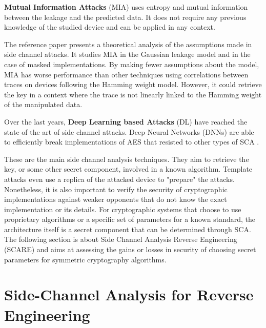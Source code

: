 \documentclass[11pt]{sdm}
\begin{document}
\textbf{Mutual Information Attacks} (MIA) uses entropy and mutual information between the leakage and the predicted data.
It does not require any previous knowledge of the studied device and can be applied in any context.

The reference paper \parencite{Prouff_Rivain_2009} presents a theoretical analysis of the assumptions made in side channel attacks.
It studies MIA in the Gaussian leakage model and in the case of masked implementations.
By making fewer assumptions about the model, MIA has worse performance than other techniques using correlations between traces on devices following the Hamming weight model.
However, it could retrieve the key in a context where the trace is not linearly linked to the Hamming weight of the manipulated data.


Over the last years, \textbf{Deep Learning based Attacks} (DL) have reached the state of the art of side channel attacks.
Deep Neural Networks (DNNs) are able to efficiently break implementations of AES that resisted to other types of SCA \parencite{Maghrebi_Portigliatti_Prouff_2016}.

These are the main side channel analysis techniques. They aim to retrieve the key, or some other secret component, involved in a known algorithm.
Template attacks even use a replica of the attacked device to "prepare" the attacks.
Nonetheless, it is also important to verify the security of cryptographic implementations against weaker opponents that do not know the exact implementation or its details.
For cryptographic systems that choose to use proprietary algorithms or a specific set of parameters for a known standard, the architecture itself is a secret component that can be determined through SCA.
The following section is about Side Channel Analysis Reverse Engineering (SCARE) and aims at assessing the gains or losses in security of choosing secret parameters for symmetric cryptography algorithms.





\section{Side-Channel Analysis for Reverse Engineering}
\end{document}
